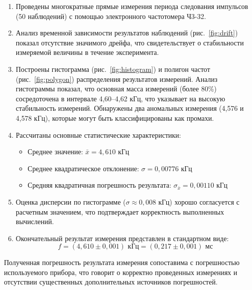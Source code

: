 \begin{enumerate}
    \item Проведены многократные прямые измерения периода следования импульсов (50 наблюдений) с помощью электронного частотомера Ч3-32.
    
    \item Анализ временной зависимости результатов наблюдений (рис.~\ref{fig:drift}) показал отсутствие значимого дрейфа, что свидетельствует о стабильности измеряемой величины в течение эксперимента.
    
    \item Построены гистограмма (рис.~\ref{fig:histogram}) и полигон частот (рис.~\ref{fig:polygon}) распределения результатов измерений. Анализ гистограммы показал, что основная масса измерений (более 80\%) сосредоточена в интервале 4,60–4,62 кГц, что указывает на высокую стабильность измерений. Обнаружены два аномальных измерения (4,576 и 4,578 кГц), которые могут быть классифицированы как промахи.
    
    \item Рассчитаны основные статистические характеристики:
    \begin{itemize}
        \item Среднее значение: $\bar{x} = 4,610$ кГц
        \item Среднее квадратическое отклонение: $\sigma = 0,00776$ кГц
        \item Средняя квадратичная погрешность результата: $\sigma_{\bar{x}} = 0,00110$ кГц
    \end{itemize}
    
    \item Оценка дисперсии по гистограмме ($\sigma \approx 0,008$ кГц) хорошо согласуется с расчетным значением, что подтверждает корректность выполненных вычислений.
    
    \item Окончательный результат измерения представлен в стандартном виде:
    \[
    f = (4,610 \pm 0,001) \text{ кГц} = (0,217 \pm 0,001) \text{ мс}
    \]
\end{enumerate}

Полученная погрешность результата измерения сопоставима с погрешностью используемого прибора, что говорит о корректно проведенных измерениях и отсутствии существенных дополнительных источников погрешностей.


